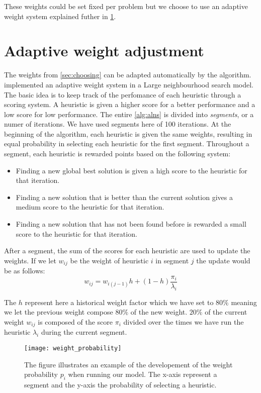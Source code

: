 \documentclass[../main.tex]{subfiles}
\begin{document}
These weights could be set fixed per problem but we choose to use an adaptive weight system explained futher in \cref{sec:weight}.

\section{Adaptive weight adjustment}
\label{sec:weight}
The weights from \cref{sec:choosing} can be adapted automatically by the algorithm. \cite{ropke06} implemented an adaptive weight system in a Large neighbourhood search model.
The basic idea is to keep track of the perfomance of each heuristic through a scoring system. 
A heuristic is given a higher score for a better performance and a low score for low performance. 
The entire \cref{alg:alns} is divided into \textit{segments}, or a numer of iterations. 
We have used segments here of 100 iterations.
At the beginning of the algorithm, each heuristic is given the same weights, resulting in equal probability in selecting each heuristic for the first segment.
Throughout a segment, each heuristic is rewarded points based on the following system:
\begin{itemize}
    \item Finding a new global best solution is given a high score to the heuristic for that iteration.
    \item Finding a new solution that is better than the current solution gives a medium score to the heuristic for that iteration.
    \item Finding a new solution that has not been found before is rewarded a small score to the heuristic for that iteration.
\end{itemize}
After a segment, the sum of the scores for each heuristic are used to update the weights. If we let $w_{ij}$ be the weight of heuristic $i$ in segment $j$ the update would be as follows:
\begin{equation}\label{eq:update}
    w_{ij} = w_{i(j-1)}h + (1-h)\dfrac{\pi_i}{\lambda_i}
\end{equation}

The $h$ represent here a historical weight factor which we have set to $80\%$ meaning we let the previous weight compose $80\%$ of the new weight. 
$20\%$ of the current weight $w_{ij}$ is composed of the score $\pi_i$ divided over the times we have run the heuristic $\lambda_i$ during the current segment.

\begin{figure}                                                                    
    \centering                                                                                     
    \texttt{[image: weight\_probability]}                                     
    \caption{The figure illustrates an example of the developement of the weight probability $p_i$ when running our model. The x-axis represent a segment and the y-axis the probability of selecting a heuristic.}
    \label{fig:weights}
\end{figure}
\end{document}
